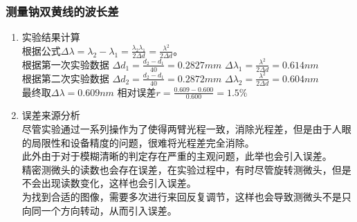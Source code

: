 \documentclass[dvipsnames, svgnames,a4paper,11pt]{article}
\begin{document}
	\subsubsection{测量钠双黄线的波长差}
	\begin{enumerate}
		\item 实验结果计算\\
		根据公式$\Delta\lambda=\lambda_{2}-\lambda_{1}=\frac{\lambda_{2}\lambda_{1}}{2\Delta d}=\frac{\lambda^{2}}{2\Delta d}$。\\
		根据第一次实验数据\hspace{0.2cm}
		$\Delta d_{1}=\frac{d_{2}-d_{1}}{40}=0.2827mm$\hspace{0.2cm}
	  $\Delta\lambda_{1}=\frac{\lambda^2}{2\Delta d}=0.614nm$\\
	  根据第二次实验数据\hspace{0.2cm}
		$\Delta d_{2}=\frac{d_{2}-d_{1}}{40}=0.2872mm$\hspace{0.2cm}
			$\Delta\lambda_{2}=\frac{\lambda^2}{2\Delta d}=0.604nm$\\
			最终取$\Delta\lambda=0.609nm$\hspace{0.2cm}
			相对误差$r=\frac{0.609-0.600}{0.600}=1.5\%$
			\item 误差来源分析\\
			尽管实验通过一系列操作为了使得两臂光程一致，消除光程差，但是由于人眼的局限性和设备精度的问题，很难将光程差完全消除。\\
			此外由于对于模糊清晰的判定存在严重的主观问题，此举也会引入误差。\\
			精密测微头的读数也会存在误差，在实验过程中，有时尽管旋转测微头，但是不会出现读数变化，这样也会引入误差。\\
			为找到合适的图像，需要多次进行来回反复调节，这样也会导致测微头不是只向同一个方向转动，从而引入误差。
	\end{enumerate}
	
\end{document}
